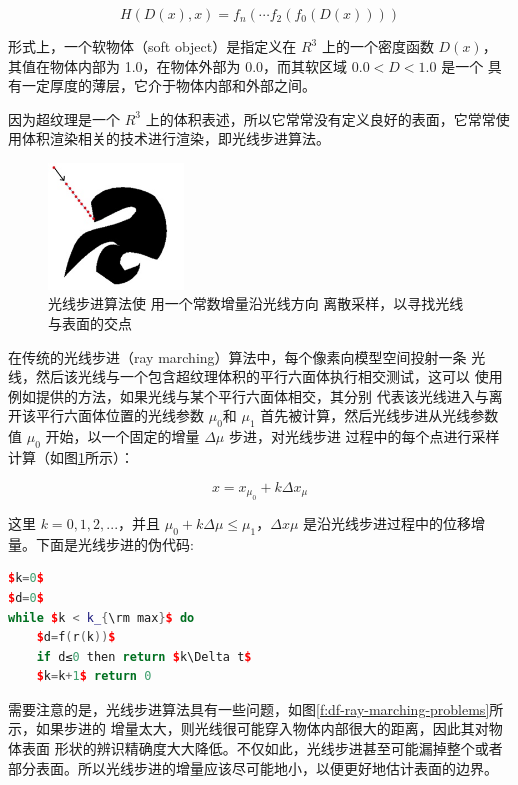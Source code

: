 \begin{equation}
	H(D(x),x)=f_n(\cdots f_2(f_0(D(x))))
\end{equation}

形式上，一个软物体（soft object）是指定义在 $R^{3}$ 上的一个密度函数 $D(x)$， 其值在物体内部为 1.0，在物体外部为 0.0，而其软区域 $0.0 < D < 1.0$ 是一个 具有一定厚度的薄层，它介于物体内部和外部之间。

因为超纹理是一个 $R^{3}$ 上的体积表述，所以它常常没有定义良好的表面，它常常使用体积渲染相关的技术进行渲染，即光线步进算法。

\begin{figure}
	\sidecaption
	\includegraphics[width=0.32\textwidth]{figures/df/ray-marching}
	\caption{光线步进算法使 用一个常数增量沿光线方向 离散采样，以寻找光线与表面的交点}
	\label{f:df-ray-marching}
\end{figure}

在传统的光线步进（ray marching）算法中，每个像素向模型空间投射一条 光线，然后该光线与一个包含超纹理体积的平行六面体执行相交测试，这可以 使用例如\cite{a:Onraytracingparametricsurfaces}提供的方法，如果光线与某个平行六面体相交，其分别 代表该光线进入与离开该平行六面体位置的光线参数 $\mu_0$和 $\mu_1$ 首先被计算，然后光线步进从光线参数值 $\mu_0$ 开始，以一个固定的增量 $\Delta\mu$ 步进，对光线步进 过程中的每个点进行采样计算（如图\ref{f:df-ray-marching}所示）：

\begin{equation}
	x=x_{\mu_0}+k\Delta x_{\mu}
\end{equation}

这里 $k = 0, 1, 2, ...$，并且 $\mu_0 + k\Delta\mu\leq \mu_1$，$\Delta x \mu$ 是沿光线步进过程中的位移增量。下面是光线步进的伪代码:

\begin{lstlisting}[language=C++, mathescape=true]
$k=0$
$d=0$
while $k < k_{\rm max}$ do
	$d=f(r(k))$
	if d≤0 then return $k\Delta t$
	$k=k+1$ return 0
\end{lstlisting}

需要注意的是，光线步进算法具有一些问题，如图\ref{f:df-ray-marching-problems}所示，如果步进的 增量太大，则光线很可能穿入物体内部很大的距离，因此其对物体表面 形状的辨识精确度大大降低。不仅如此，光线步进甚至可能漏掉整个或者部分表面。所以光线步进的增量应该尽可能地小，以便更好地估计表面的边界。

